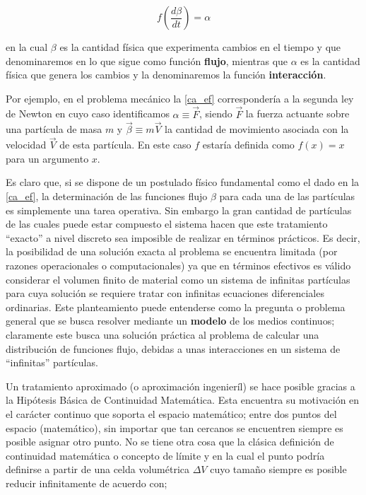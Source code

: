 \documentclass[../notas medios.tex]{subfiles}
\begin{document}
\begin{equation}
f\left( {\frac{{d\beta }}{{dt}}} \right) = \alpha
\label{ca_ef}
\end{equation}

\noindent en la cual $\beta$ es la cantidad física que experimenta cambios en el
tiempo y que denominaremos en lo que sigue como función {\bf flujo}, mientras que $\alpha$ es la cantidad física que genera los cambios y la denominaremos la función {\bf interacción}.

Por ejemplo, en el problema mecánico la \cref{ca_ef} correspondería a la segunda ley de Newton en cuyo caso identificamos $\alpha  \equiv \vec F$, siendo $\vec F$ la fuerza actuante sobre una partícula de masa $m$ y $\vec \beta  \equiv m\vec V$  la cantidad de movimiento asociada con la velocidad $\vec V$ de esta partícula.  En este caso $f$ estaría definida como  $f(x)=x$ para un argumento $x$.

Es claro que, si se dispone de un postulado físico fundamental como el dado en
la \cref{ca_ef}, la determinación de las funciones flujo $\beta$ para cada una de las partículas es simplemente una tarea operativa.  Sin embargo la gran cantidad de partículas de las cuales puede estar compuesto el sistema hacen que este tratamiento “exacto” a nivel discreto sea imposible de realizar en términos prácticos.  Es decir, la posibilidad de una solución exacta al problema se encuentra limitada (por razones operacionales o computacionales) ya que en términos efectivos es válido considerar el volumen finito de material como un sistema de infinitas partículas para cuya solución se requiere tratar con infinitas ecuaciones diferenciales ordinarias.  Este planteamiento puede entenderse como la pregunta o problema general que se busca resolver mediante un {\bf modelo} de los medios continuos; claramente este busca una solución práctica al problema de calcular una distribución de funciones flujo, debidas a unas interacciones en un sistema de “infinitas” partículas.

Un tratamiento aproximado (o aproximación ingenieríl) se hace posible gracias a la Hipótesis Básica de Continuidad Matemática.  Esta encuentra su motivación en el carácter continuo que soporta el espacio matemático; entre dos puntos del espacio (matemático), sin importar que tan cercanos se encuentren siempre es posible asignar otro punto.  No se tiene otra cosa que la clásica definición de continuidad matemática o concepto de límite y en la cual el punto podría definirse a partir de una celda volumétrica $\Delta V$ cuyo tamaño siempre es posible reducir infinitamente de acuerdo con;
\end{document}
